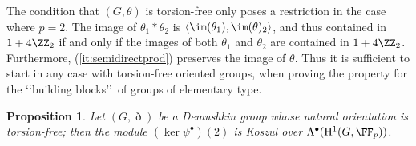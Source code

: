 \documentclass{amsart}
\newtheorem{prop}[thm]{Proposition}
\theoremstyle{definition}
\theoremstyle{remark}
\newcommand{\rmH}{\mathrm{H}}
\numberwithin{equation}{section}
\begin{document}
The condition that $(G,\theta)$ is torsion-free only poses a restriction in the case where $p=2$. The image of $\theta_1*\theta_2$ is $\langle \im(\theta_1),\im(\theta)_2\rangle$, and thus contained in $1+4\ZZ_2$ if and only if the images of both $\theta_1$ and $\theta_2$ are contained in $1+4\ZZ_2$. Furthermore, (\ref{it:semidirectprod}) preserves the image of $\theta$. Thus it is sufficient to start in any case with torsion-free oriented groups, when proving the property for the \lq\lq building blocks\rq\rq\, of groups of elementary type.

\begin{prop}
\label{prop:DemushkinKoszul}
    Let $(G,\eth)$ be a Demushkin group whose natural orientation is torsion-free; then the module $(\ker \psi^\bullet)(2)$ is Koszul over $\Lambda^\bullet(\rmH^1(G,\FF_p))$.
\end{prop}
\end{document}
